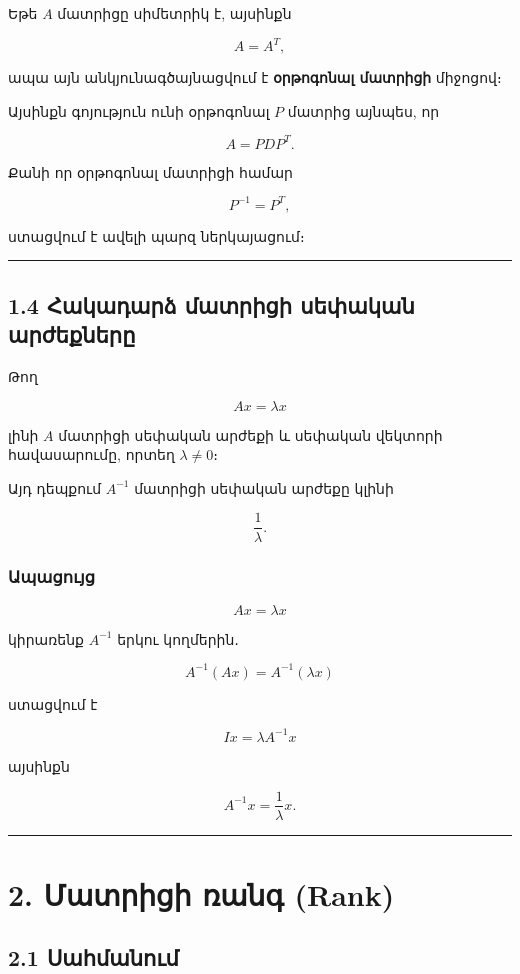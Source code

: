 \documentclass[12pt, a4paper]{article}
\begin{document}
Եթե \(A\) մատրիցը սիմետրիկ է, այսինքն

$$
A = A^T,
$$

ապա այն անկյունագծայնացվում է \textbf{օրթոգոնալ մատրիցի} միջոցով։

Այսինքն գոյություն ունի օրթոգոնալ \(P\) մատրից այնպես, որ

$$
A = P D P^T.
$$

Քանի որ օրթոգոնալ մատրիցի համար

$$
P^{-1} = P^T,
$$

ստացվում է ավելի պարզ ներկայացում։

\vspace{1em}
\hrule
\vspace{1em}

\subsection{1.4 Հակադարձ մատրիցի սեփական արժեքները}

Թող

$$
Ax = \lambda x
$$

լինի \(A\) մատրիցի սեփական արժեքի և սեփական վեկտորի հավասարումը, որտեղ \(\lambda \neq 0\)։

Այդ դեպքում \(A^{-1}\) մատրիցի սեփական արժեքը կլինի

$$
\frac{1}{\lambda}.
$$

\subsubsection{Ապացույց}

$$
Ax = \lambda x
$$

կիրառենք \(A^{-1}\) երկու կողմերին․

$$
A^{-1}(Ax) = A^{-1}(\lambda x)
$$

ստացվում է

$$
Ix = \lambda A^{-1}x
$$

այսինքն

$$
A^{-1}x = \frac{1}{\lambda}x.
$$

\vspace{1em}
\hrule
\vspace{1em}

\section{2. Մատրիցի ռանգ (Rank)}

\subsection{2.1 Սահմանում}
\end{document}
